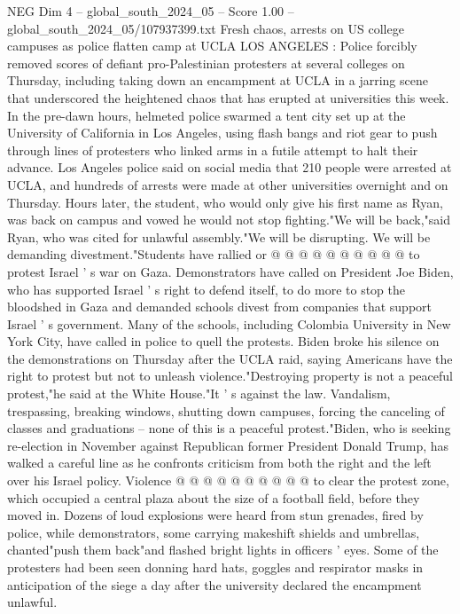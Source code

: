 \begin{textsample}{NEG Dim 4 – global\_south\_2024\_05 – Score 1.00 – global\_south\_2024\_05/107937399.txt}  \label{ex:f4_neg_278}
Fresh chaos, arrests on US college campuses as police flatten camp at UCLA LOS ANGELES : Police forcibly removed scores of defiant pro-Palestinian protesters at several colleges on Thursday, including taking down an encampment at UCLA in a jarring scene that underscored the heightened chaos that has erupted at universities this week.
In the pre-dawn hours, helmeted police swarmed a tent city set up at the University of California in Los Angeles, using flash bangs and riot gear to push through lines of protesters who linked arms in a futile attempt to halt their advance.
Los Angeles police said on social media that 210 people were arrested at UCLA, and hundreds of arrests were made at other universities overnight and on Thursday.
Hours later, the student, who would only give his first name as Ryan, was back on campus and vowed he would not stop fighting."We will be back,"said Ryan, who was cited for unlawful assembly."We will be disrupting.
We will be demanding divestment."Students have rallied or @ @ @ @ @ @ @ @ @ @ to protest Israel ' s war on Gaza.
Demonstrators have called on President Joe Biden, who has supported Israel ' s right to defend itself, to do more to stop the bloodshed in Gaza and demanded schools divest from companies that support Israel ' s government.
Many of the schools, including Colombia University in New York City, have called in police to quell the protests.
Biden broke his silence on the demonstrations on Thursday after the UCLA raid, saying Americans have the right to protest but not to unleash violence."Destroying property is not a peaceful protest,"he said at the White House."It ' s against the law.
Vandalism, trespassing, breaking windows, shutting down campuses, forcing the canceling of classes and graduations -- none of this is a peaceful protest."Biden, who is seeking re-election in November against Republican former President Donald Trump, has walked a careful line as he confronts criticism from both the right and the left over his Israel policy.
Violence @ @ @ @ @ @ @ @ @ @ to clear the protest zone, which occupied a central plaza about the size of a football field, before they moved in.
Dozens of loud explosions were heard from stun grenades, fired by police, while demonstrators, some carrying makeshift shields and umbrellas, chanted"push them back"and flashed bright lights in officers ' eyes.
Some of the protesters had been seen donning hard hats, goggles and respirator masks in anticipation of the siege a day after the university declared the encampment unlawful.

\end{textsample}
